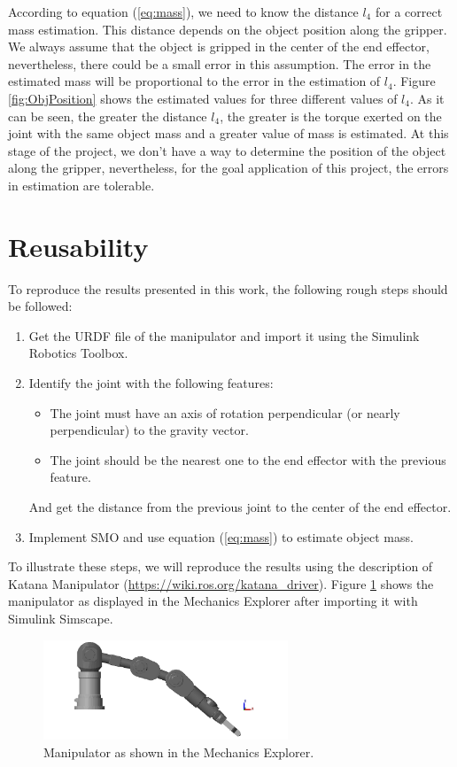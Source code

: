 \documentclass[smallextended]{svjour3}       %
\begin{document}
According to equation (\ref{eq:mass}), we need to know the distance $l_4$ for a correct mass estimation. This distance depends on the object position along the gripper. We always assume that the object is gripped in the center of the end effector, nevertheless, there could be a small error in this assumption. The error in the estimated mass will be proportional to the error in the estimation of $l_4$. Figure \ref{fig:ObjPosition} shows the estimated values for three different values of $l_4$. As it can be seen, the greater the distance $l_4$, the greater is the torque exerted on the joint with the same object mass and a greater value of mass is estimated. At this stage of the project, we don't have a way to determine the position of the object along the gripper, nevertheless, for the goal application of this project, the errors in estimation are tolerable. 

\section{Reusability}
\label{sec:Reusability}
To reproduce the results presented in this work, the following rough steps should be followed:
\begin{enumerate}
\item Get the URDF file of the manipulator and import it using the Simulink Robotics Toolbox. 
\item Identify the joint with the following features:
  \begin{itemize}
  \item The joint must have an axis of rotation perpendicular (or nearly perpendicular) to the gravity vector. 
  \item The joint should be the nearest one to the end effector with the previous feature. 
  \end{itemize}
  And get the distance from the previous joint to the center of the end effector.
\item Implement SMO and use equation (\ref{eq:mass}) to estimate object mass. 
\end{enumerate}

To illustrate these steps, we will reproduce the results using the description of Katana Manipulator (\url{https://wiki.ros.org/katana_driver}). Figure \ref{fig:KatanaSimulink} shows the manipulator as displayed in the Mechanics Explorer after importing it with Simulink Simscape. 

\begin{figure}
  \centering
  \includegraphics[width=0.65\textwidth]{Figures/KatanaMechanics.png}
  \caption{Manipulator as shown in the Mechanics Explorer.}
  \label{fig:KatanaSimulink}
\end{figure}
\end{document}
